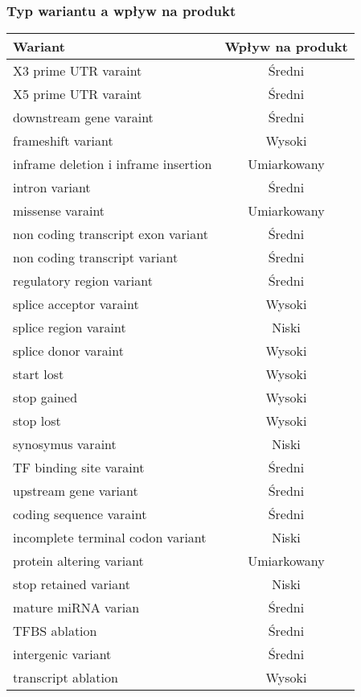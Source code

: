 \documentclass[12pt]{article}
\begin{document}
\subsubsection{Typ wariantu a wpływ na produkt}
\vspace{1cm}
\begin{center}
\begin{tabular}{|l|c|}
Wariant & Wpływ na produkt \\  \hline
X3 prime UTR varaint & Średni\\ 
X5 prime UTR varaint & Średni\\ 
downstream gene varaint & Średni\\ 
frameshift variant & Wysoki\\ 
inframe deletion i inframe insertion & Umiarkowany\\ 
intron variant & Średni\\ 
missense varaint & Umiarkowany\\ 
non coding transcript exon variant & Średni \\ 
non coding transcript variant & Średni\\ 
regulatory region variant & Średni\\ 
splice acceptor varaint & Wysoki\\ 
splice region varaint  & Niski\\ 
splice donor varaint & Wysoki\\ 
start lost & Wysoki\\ 
stop gained & Wysoki\\ 
stop lost & Wysoki\\ 
synosymus varaint & Niski\\ 
TF binding site varaint & Średni\\ 
upstream gene variant & Średni\\ 
coding sequence varaint & Średni\\ 
incomplete terminal codon variant & Niski\\ 
protein altering variant & Umiarkowany\\ 
stop retained variant & Niski\\ 
mature miRNA varian & Średni\\ 
TFBS ablation & Średni\\ 
intergenic variant & Średni\\ 
transcript ablation & Wysoki\\ 
\end{tabular}
\end{center}
\end{document}
